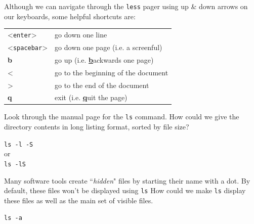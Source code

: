 \begin{information}
Although we can navigate through the \texttt{less} pager using up \& down arrows on our keyboards, some helpful shortcuts are:\\

\begin{center}
   \begin{tabular}{p{4cm} p{8cm}}
     \hline
     \textless\texttt{enter}\textgreater & go down one line \\
     \textless\texttt{spacebar}\textgreater & go down one page (i.e. a screenful) \\
     \textbf{b} & go up (i.e. \textbf{\underline{b}}ackwards one page) \\
     \textless & go to the beginning of the document \\
     \textgreater & go to the end of the document \\
     \textbf{q} & exit (i.e. \textbf{\underline{q}}uit the page) \\
     \hline
   \end{tabular}
\end{center}
\end{information}

\begin{questions}
Look through the manual page for the \texttt{ls} command.
How could we give the directory contents in long listing format, sorted by file size? \\
\begin{answer}
\texttt{ls -l -S ~} \\
or \\
\texttt{ls -lS ~} \\
\end{answer}

Many software tools create ``\textit{hidden}" files by starting their name with a dot.
By default, these files won't be displayed using \texttt{ls}
How could we make \texttt{ls}  display these files as well as the main set of visible files.

\begin{answer}
\texttt{ls -a ~} \\
\end{answer}
\end{questions}

